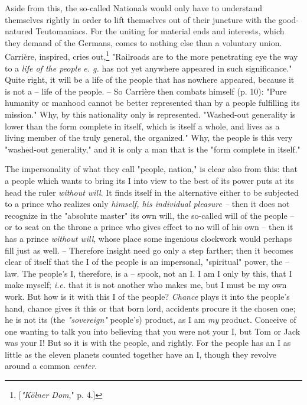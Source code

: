 \documentclass[a4paper]{book}
\begin{document}
Aside from this, the so-called Nationals would only have to understand 
themselves rightly in order to lift themselves out of their juncture with the 
good-natured Teutomaniacs. For the uniting for material ends and interests, 
which they demand of the Germans, comes to nothing else than a voluntary 
union. Carri\`ere, inspired, cries out,\footnote{[\textit{"{}K\"olner Dom},"{} 
p. 4.]} "{}Railroads are to the more penetrating eye the way to a \textit{life 
of the people} \textit{e. g.} has not yet anywhere appeared in such 
significance."{} Quite right, it will be a life of the people that has nowhere 
appeared, because it is not a -- life of the people. -- So Carri\`ere then 
combats himself (p. 10): "{}Pure humanity or manhood cannot be better 
represented than by a people fulfilling its mission."{} Why, by this 
nationality only is represented. "{}Washed-out generality is lower than the 
form complete in itself, which is itself a whole, and lives as a living member 
of the truly general, the organized."{} Why, the people is this very 
"{}washed-out generality,"{} and it is only a man that is the "{}form complete 
in itself."{}

The impersonality of what they call "{}people, nation,"{} is clear also from 
this: that a people which wants to bring its I into view to the best of its 
power puts at its head the ruler \textit{without will}. It finds itself in the 
alternative either to be subjected to a prince who realizes only 
\textit{himself, his individual pleasure --} then it does not recognize in the 
"{}absolute master"{} its own will, the so-called will of the people -- or to 
seat on the throne a prince who gives effect to no will of his own -- then it 
has a prince \textit{without will}, whose place some ingenious clockwork would 
perhaps fill just as well. -- Therefore insight need go only a step farther; 
then it becomes clear of itself that the I of the people is an impersonal, 
"{}spiritual"{} power, the -- law. The people's I, therefore, is a -- spook, 
not an I. I am I only by this, that I make myself; \textit{i.e.} that it is 
not another who makes me, but I must be my own work. But how is it with this I 
of the people? \textit{Chance} plays it into the people's hand, chance gives 
it this or that born lord, accidents procure it the chosen one; he is not its 
(the \textit{"{}sovereign"{}} people's) product, as I am \textit{my} product. 
Conceive of one wanting to talk you into believing that you were not your I, 
but Tom or Jack was your I! But so it is with the people, and rightly. For the 
people has an I as little as the eleven planets counted together have an I, 
though they revolve around a common \textit{center}.
\end{document}
